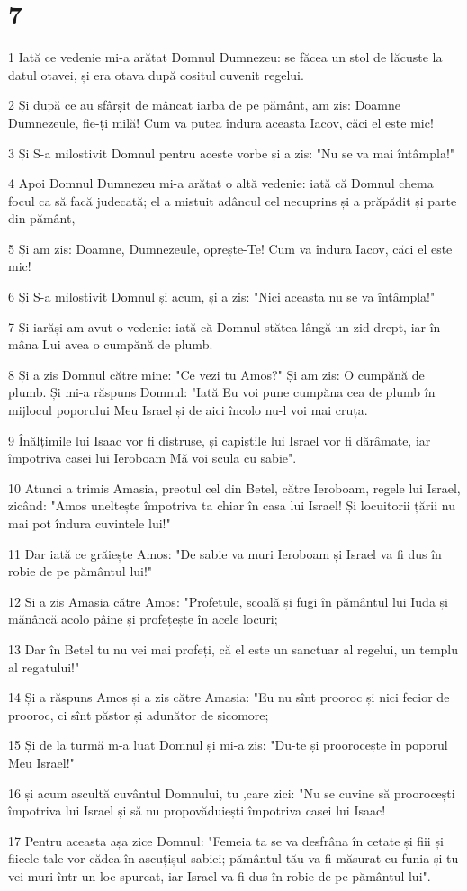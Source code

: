 \chapter{7}

\par 1 Iată ce vedenie mi-a arătat Domnul Dumnezeu: se făcea un stol de lăcuste la datul otavei, și era otava după cositul cuvenit regelui.
\par 2 Și după ce au sfârșit de mâncat iarba de pe pământ, am zis: Doamne Dumnezeule, fie-ți milă! Cum va putea îndura aceasta Iacov, căci el este mic!
\par 3 Și S-a milostivit Domnul pentru aceste vorbe și a zis: "Nu se va mai întâmpla!"
\par 4 Apoi Domnul Dumnezeu mi-a arătat o altă vedenie: iată că Domnul chema focul ca să facă judecată; el a mistuit adâncul cel necuprins și a prăpădit și parte din pământ,
\par 5 Și am zis: Doamne, Dumnezeule, oprește-Te! Cum va îndura Iacov, căci el este mic!
\par 6 Și S-a milostivit Domnul și acum, și a zis: "Nici aceasta nu se va întâmpla!"
\par 7 Și iarăși am avut o vedenie: iată că Domnul stătea lângă un zid drept, iar în mâna Lui avea o cumpănă de plumb.
\par 8 Și a zis Domnul către mine: "Ce vezi tu Amos?" Și am zis: O cumpănă de plumb. Și mi-a răspuns Domnul: "Iată Eu voi pune cumpăna cea de plumb în mijlocul poporului Meu Israel și de aici încolo nu-l voi mai cruța.
\par 9 Înălțimile lui Isaac vor fi distruse, și capiștile lui Israel vor fi dărâmate, iar împotriva casei lui Ieroboam Mă voi scula cu sabie".
\par 10 Atunci a trimis Amasia, preotul cel din Betel, către Ieroboam, regele lui Israel, zicând: "Amos uneltește împotriva ta chiar în casa lui Israel! Și locuitorii țării nu mai pot îndura cuvintele lui!"
\par 11 Dar iată ce grăiește Amos: "De sabie va muri Ieroboam și Israel va fi dus în robie de pe pământul lui!"
\par 12 Si a zis Amasia către Amos: "Profetule, scoală și fugi în pământul lui Iuda și mănâncă acolo pâine și profețește în acele locuri;
\par 13 Dar în Betel tu nu vei mai profeți, că el este un sanctuar al regelui, un templu al regatului!"
\par 14 Și a răspuns Amos și a zis către Amasia: "Eu nu sînt prooroc și nici fecior de prooroc, ci sînt păstor și adunător de sicomore;
\par 15 Și de la turmă m-a luat Domnul și mi-a zis: "Du-te și proorocește în poporul Meu Israel!"
\par 16 și acum ascultă cuvântul Domnului, tu ,care zici: "Nu se cuvine să proorocești împotriva lui Israel și să nu propovăduiești împotriva casei lui Isaac!
\par 17 Pentru aceasta așa zice Domnul: "Femeia ta se va desfrâna în cetate și fiii și fiicele tale vor cădea în ascuțișul sabiei; pământul tău va fi măsurat cu funia și tu vei muri într-un loc spurcat, iar Israel va fi dus în robie de pe pământul lui".

